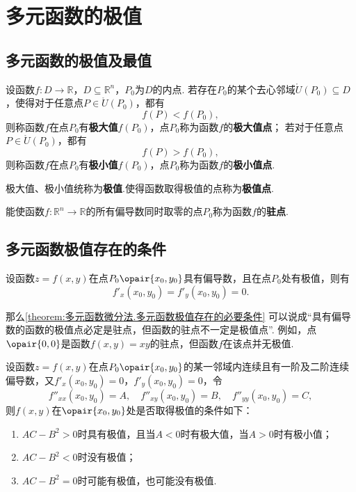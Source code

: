 \section{多元函数的极值}
\subsection{多元函数的极值及最值}
\begin{definition}
设函数\(f\colon D \to \mathbb{R}\)，\(D \subseteq \mathbb{R}^n\)，\(P_0\)为\(D\)的内点.
若存在\(P_0\)的某个去心邻域\(\mathring{U}(P_0) \subseteq D\)，使得对于任意点\(P \in \mathring{U}(P_0)\)，都有\[
f(P) < f(P_0),
\]则称函数\(f\)在点\(P_0\)有\textbf{极大值}\(f(P_0)\)，点\(P_0\)称为函数\(f\)的\textbf{极大值点}；
若对于任意点\(P \in \mathring{U}(P_0)\)，都有\[
f(P) > f(P_0),
\]则称函数\(f\)在点\(P_0\)有\textbf{极小值}\(f(P_0)\)，点\(P_0\)称为函数\(f\)的\textbf{极小值点}.

极大值、极小值统称为\textbf{极值}.使得函数取得极值的点称为\textbf{极值点}.
\end{definition}

\begin{definition}[驻点]
能使函数\(f\colon \mathbb{R}^n \to \mathbb{R}\)的所有偏导数同时取零的点\(P_0\)称为函数\(f\)的\textbf{驻点}.
\end{definition}

\subsection{多元函数极值存在的条件}
\begin{theorem}[必要条件]\label{theorem:多元函数微分法.多元函数极值存在的必要条件}
设函数\(z=f(x,y)\)在点\(P_0\opair{x_0,y_0}\)具有偏导数，且在点\(P_0\)处有极值，则有\[
f'_x(x_0,y_0) = f'_y(x_0,y_0) = 0.
\]
\end{theorem}

那么\cref{theorem:多元函数微分法.多元函数极值存在的必要条件} 可以说成“具有偏导数的函数的极值点必定是驻点，但函数的驻点不一定是极值点”.
例如，点\(\opair{0,0}\)是函数\(f(x,y) = xy\)的驻点，但函数\(f\)在该点并无极值.

\begin{theorem}[充分条件]\label{theorem:多元函数微分法.多元函数极值存在的充分条件}
设函数\(z=f(x,y)\)在点\(P_0\opair{x_0,y_0}\)的某一邻域内连续且有一阶及二阶连续偏导数，又\(f'_x(x_0,y_0)=0\)，\(f'_y(x_0,y_0)=0\)，令\[
f''_{xx}(x_0,y_0)=A, \quad
f''_{xy}(x_0,y_0)=B, \quad
f''_{yy}(x_0,y_0)=C,
\]则\(f(x,y)\)在\(\opair{x_0,y_0}\)处是否取得极值的条件如下：
\begin{enumerate}
\item \(AC-B^2>0\)时具有极值，且当\(A<0\)时有极大值，当\(A>0\)时有极小值；
\item \(AC-B^2<0\)时没有极值；
\item \(AC-B^2=0\)时可能有极值，也可能没有极值.
\end{enumerate}
\end{theorem}

